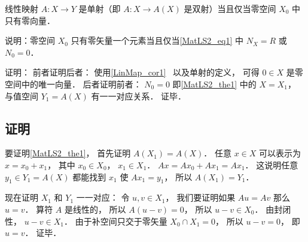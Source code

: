 \begin{corollary}{}
线性映射 $A:X\to Y$ 是单射（即 $A:X\to A(X)$ 是双射）当且仅当零空间 $X_0$ 中只有零向量．
\end{corollary}
说明：零空间 $X_0$ 只有零矢量一个元素当且仅当\autoref{MatLS2_eq1} 中 $N_X = R$ 或 $N_0 = 0$．

证明： 前者证明后者： 使用\autoref{LinMap_cor1}~ 以及单射的定义， 可得 $0\in X$ 是零空间中的唯一向量． 后者证明前者： $N_0 = 0$ 即\autoref{MatLS2_the1} 中的 $X = X_1$， 与值空间 $Y_1 = A(X)$ 有一一对应关系． 证毕．

\subsection{证明}
要证明\autoref{MatLS2_the1}， 首先证明 $A(X_1) = A(X)$． 任意 $x\in X$ 可以表示为 $x = x_0 + x_1$， 其中 $x_0\in X_0$， $x_1\in X_1$． $Ax = A x_0 + A x_1 = A x_1$． 这说明任意 $y_1 \in Y_1 = A(X)$ 都能找到 $x_1$ 使 $A x_1 = y_1$， 所以 $A(X_1) = Y_1$．

现在证明 $X_1$ 和 $Y_1$ 一一对应： 令 $u, v \in X_1$， 我们要证明如果 $Au = Av$ 那么 $u = v$． 算符 $A$ 是线性的， 所以 $A(u-v) = 0$， 所以 $u - v \in X_0$． 由封闭性， $u - v \in X_1$． 由于补空间只交于零矢量 $X_0 \cap X_1 = \qty{0}$， 所以 $u - v = 0$， 即 $u = v$． 证毕．

